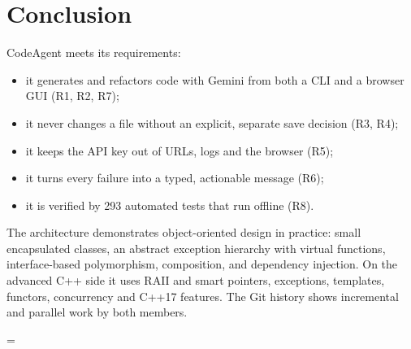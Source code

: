 \documentclass[12pt,a4paper,oneside]{book}
\begin{document}
\section{Conclusion}
CodeAgent meets its requirements:
\begin{itemize}
  \item it generates and refactors code with Gemini from both a CLI and a
    browser GUI (R1, R2, R7);
  \item it never changes a file without an explicit, separate save decision
    (R3, R4);
  \item it keeps the API key out of URLs, logs and the browser (R5);
  \item it turns every failure into a typed, actionable message (R6);
  \item it is verified by 293 automated tests that run offline (R8).
\end{itemize}

The architecture demonstrates object-oriented design in practice: small
encapsulated classes, an abstract exception hierarchy with virtual functions,
interface-based polymorphism, composition, and dependency injection. On the
advanced C++ side it uses RAII and smart pointers, exceptions, templates,
functors, concurrency and C++17 features. The Git history shows incremental
and parallel work by both members.

\let\topfraction\codeagentOldTopfraction
\let\bottomfraction\codeagentOldBottomfraction
\let\textfraction\codeagentOldTextfraction
\let\floatpagefraction\codeagentOldFloatpagefraction
\setcounter{topnumber}{\codeagentOldTopnumber}
\setcounter{totalnumber}{\codeagentOldTotalnumber}
\makeatletter
\setlength{\@fptop}{\codeagentOldFptop}
\makeatother
\setlength{\emergencystretch}{\codeagentOldEmergencystretch}
\tolerance=\codeagentOldTolerance
\end{document}
